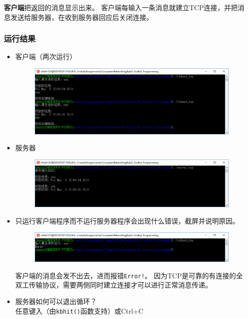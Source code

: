 \documentclass[logo,reportComp]{thesis}
\begin{document}
\textbf{客户端}把返回的消息显示出来。
客户端每输入一条消息就建立TCP连接，并把消息发送给服务器，在收到服务器回应后关闭连接。

\subsubsection{运行结果}
\begin{itemize}
\item 客户端（两次运行）
\begin{figure}[H]
\centering
\includegraphics[width=0.8\linewidth]{fig/tcp-client.PNG}
\end{figure}
\item 服务器
\begin{figure}[H]
\centering
\includegraphics[width=0.8\linewidth]{fig/tcp-server.PNG}
\end{figure}
\item 只运行客户端程序而不运行服务器程序会出现什么错误，截屏并说明原因。
\begin{figure}[H]
\centering
\includegraphics[width=0.8\linewidth]{fig/tcp-client-error.PNG}
\end{figure}
客户端的消息会发不出去，进而报错\verb'Error!'。
因为TCP是可靠的有连接的全双工传输协议，需要两侧同时建立连接才可以进行正常消息传递。
\item 服务器如何可以退出循环？\\
任意键入（由\verb'kbhit()'函数支持）或Ctrl+C
\end{itemize}
\end{document}
